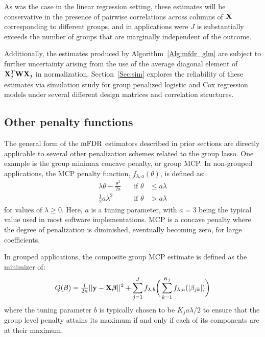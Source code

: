 As was the case in the linear regression setting, these estimates will be conservative in the presence of pairwise correlations across columns of $\mathbf{X}$ corresponding to different groups, and in applications were $J$ is substantially exceeds the number of groups that are marginally independent of the outcome. 

Additionally, the estimates produced by Algorithm~\ref{Alg:mfdr_glm} are subject to further uncertainty arising from the use of the average diagonal element of $\mathbf{X}_j^T\mathbf{W}\mathbf{X}_j$ in normalization. Section~\ref{Sec:sim} explores the reliability of these estimates via simulation study for group penalized logistic and Cox regression models under several different design matrices and correlation structures.

\subsection{Other penalty functions}

The general form of the $\textrm{mFDR}$ estimators described in prior sections are directly applicable to several other penalization schemes related to the group lasso. One example is the group minimax concave penalty, or group MCP. In non-grouped applications, the MCP penalty function, $f_{\lambda, a}(\theta)$, is defined as:
\begin{equation}
\label{eq:mcp}
\begin{alignedat}{2}
\lambda\theta - \tfrac{\theta^2}{2a} &\quad \text{if } \theta &\leq a\lambda \\
\tfrac{1}{2}a\lambda^2 &\quad \text{if } \theta &> a\lambda
\end{alignedat}
\end{equation}
for values of $\lambda \geq 0$. Here, $a$ is a tuning parameter, with $a = 3$ being the typical value used in most software implementations. MCP is a concave penalty where the degree of penalization is diminished, eventually becoming zero, for large coefficients. 

In grouped applications, the composite group MCP estimate \citep{Breheny2012, Huang2012} is defined as the minimizer of:
\begin{equation}
Q(\boldsymbol{\beta}) = \tfrac{1}{2n}||\mathbf{y} - \mathbf{X}\boldsymbol{\beta}||^2 + \sum_{j = 1}^{J}f_{\lambda, b}\bigg(\sum_{k=1}^{K_j} f_{\lambda,a}(|\beta_{jk}|)\bigg)
\end{equation}
where the tuning parameter $b$ is typically chosen to be $K_ja\lambda/2$ to ensure that the group level penalty attains its maximum if and only if each of its components are at their maximum.

